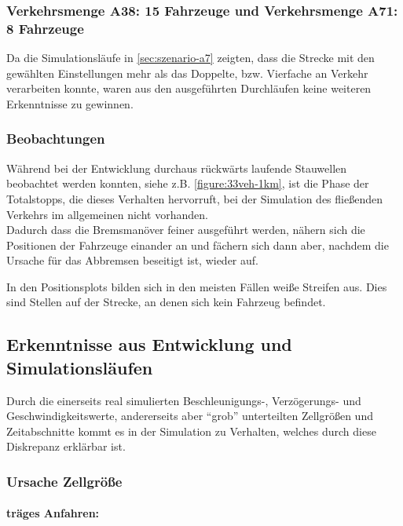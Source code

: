 \subsubsection{Verkehrsmenge A38: 15 Fahrzeuge und Verkehrsmenge A71: 8 Fahrzeuge}
\label{sec:szenario-a38-a71}

Da die Simulationsläufe in \cref{sec:szenario-a7} zeigten, dass die Strecke mit den gewählten Einstellungen mehr als das Doppelte, bzw. Vierfache an Verkehr verarbeiten konnte, waren aus den ausgeführten Durchläufen keine weiteren Erkenntnisse zu gewinnen.



\subsubsection{Beobachtungen}

Während bei der Entwicklung durchaus rückwärts laufende Stauwellen beobachtet werden konnten, siehe z.B. \cref{figure:33veh-1km}, ist die Phase der Totalstopps, die dieses Verhalten hervorruft, bei der Simulation des fließenden Verkehrs im allgemeinen nicht vorhanden.
\\
Dadurch dass die Bremsmanöver feiner ausgeführt werden, nähern sich die Positionen der Fahrzeuge einander an und fächern sich dann aber, nachdem die Ursache für das Abbremsen beseitigt ist, wieder auf.

In den Positionsplots bilden sich in den meisten Fällen weiße Streifen aus. Dies sind Stellen auf der Strecke, an denen sich kein Fahrzeug befindet.





\subsection{Erkenntnisse aus Entwicklung und Simulationsläufen}

Durch die einerseits real simulierten Beschleunigungs-, Verzögerungs- und Geschwindigkeitswerte, andererseits aber \enquote{grob} unterteilten Zellgrößen und Zeitabschnitte kommt es in der Simulation zu Verhalten, welches durch diese Diskrepanz erklärbar ist.


\subsubsection{Ursache Zellgröße}

\paragraph{träges Anfahren:}
\label{sec:accelerategroove}

